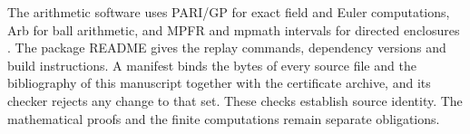 The arithmetic software uses PARI/GP for exact field and Euler
computations, Arb for ball arithmetic, and MPFR and mpmath intervals for
directed enclosures \cite{PARI,Johansson2017,MPFR,Mpmath}.
The package README gives the replay commands, dependency versions and
build instructions. A manifest binds the bytes of every source file and
the bibliography of this manuscript together with the certificate
archive, and its checker rejects any change to that set. These
checks establish source identity. The mathematical proofs and the
finite computations remain separate obligations.
